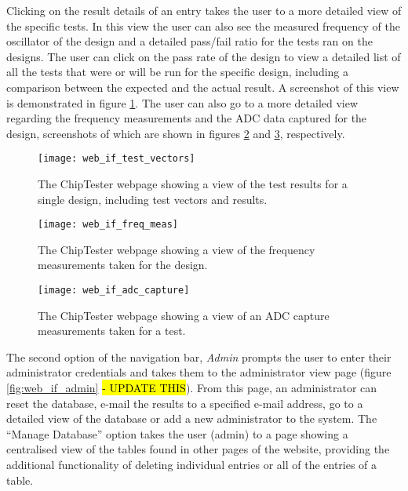 Clicking on the result details of an entry takes the user to a more detailed view of the specific tests. In this view the user can also see the measured frequency of the oscillator of the design and a detailed pass/fail ratio for the tests ran on the designs. The user can click on the pass rate of the design to view a detailed list of all the tests that were or will be run for the specific design, including a comparison between the expected and the actual result. A screenshot of this view is demonstrated in figure \ref{fig:web_if_test_vectors}. The user can also go to a more detailed view regarding the frequency measurements and the ADC data captured for the design, screenshots of which are shown in figures \ref{fig:web_if_freq_meas} and \ref{fig:web_if_adc_capture}, respectively.

\begin{figure}[ht]
 \centering
 \texttt{[image: web\_if\_test\_vectors]}
 \caption{The ChipTester webpage showing a view of the test results for a single design, including test vectors and results.}
 \label{fig:web_if_test_vectors}
\end{figure}

\begin{figure}[ht]
 \centering
 \texttt{[image: web\_if\_freq\_meas]}
 \caption{The ChipTester webpage showing a view of the frequency measurements taken for the design.}
 \label{fig:web_if_freq_meas}
\end{figure}

\begin{figure}[ht]
 \centering
 \texttt{[image: web\_if\_adc\_capture]}
 \caption{The ChipTester webpage showing a view of an ADC capture measurements taken for a test.}
 \label{fig:web_if_adc_capture}
\end{figure}

The second option of the navigation bar, \textit{Admin} prompts the user to enter their administrator credentials and takes them to the administrator view page (figure \ref{fig:web_if_admin}\hl{ - UPDATE THIS}). From this page, an administrator can reset the database, e-mail the results to a specified e-mail address, go to a detailed view of the database or add a new administrator to the system. The ``Manage Database'' option takes the user (admin) to a page showing a centralised view of the tables found in other pages of the website, providing the additional functionality of deleting individual entries or all of the entries of a table.

